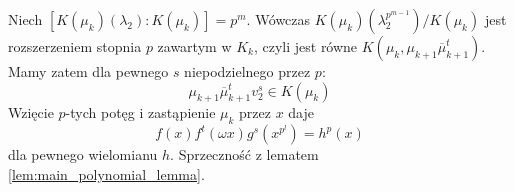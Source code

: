 Niech $\left[K\left(\mu_k\right)\left(\lambda_2\right) :
K\left(\mu_k\right)\right] = p^m$.
Wówczas 
$K\left(\mu_k\right)\left(\lambda_2^{p^{m-1}}\right)/K\left(\mu_k\right)$ jest
rozszerzeniem stopnia $p$ zawartym w $K_k$, czyli jest równe 
$K \left( \mu_k, \mu_{k+1} \overline{\mu}_{k+1}^t \right)$.
Mamy zatem dla pewnego $s$ niepodzielnego przez $p$:
\[\mu_{k+1} \overline{\mu}_{k+1}^tv_2^s \in K\left(\mu_k\right)\]
Wzięcie $p$-tych potęg i zastąpienie $\mu_k$ przez $x$ daje
\[f(x)f^t(\omega x)g^s\left(x^{p^l}\right) = h^p(x)\]
dla pewnego wielomianu $h$. Sprzeczność z lematem
\ref{lem:main_polynomial_lemma}.
